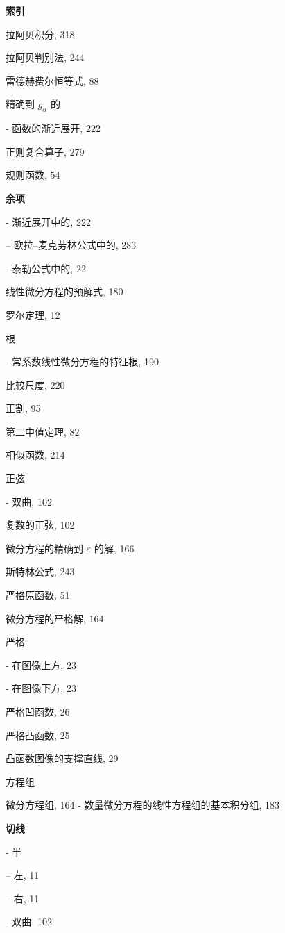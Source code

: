 \par\noindent\textbf{索引}\par

拉阿贝积分, 318

拉阿贝判别法, 244

雷德赫费尔恒等式, 88

精确到 \(g_{\alpha}\) 的

- 函数的渐近展开, 222

正则复合算子, 279

规则函数, 54

\par\noindent\textbf{余项}\par

- 渐近展开中的, 222

-- 欧拉–麦克劳林公式中的, 283

- 泰勒公式中的, 22

线性微分方程的预解式, 180

罗尔定理, 12

根

- 常系数线性微分方程的特征根, 190

比较尺度, 220

正割, 95

第二中值定理, 82

相似函数, 214

正弦

- 双曲, 102

复数的正弦, 102

微分方程的精确到 \(\varepsilon\) 的解, 166

斯特林公式, 243

严格原函数, 51

微分方程的严格解, 164

严格

- 在图像上方, 23

- 在图像下方, 23

严格凹函数, 26

严格凸函数, 25

凸函数图像的支撑直线, 29

方程组

微分方程组, 164 - 数量微分方程的线性方程组的基本积分组, 183

\par\noindent\textbf{切线}\par

- 半

-- 左, 11

-- 右, 11

- 双曲, 102

